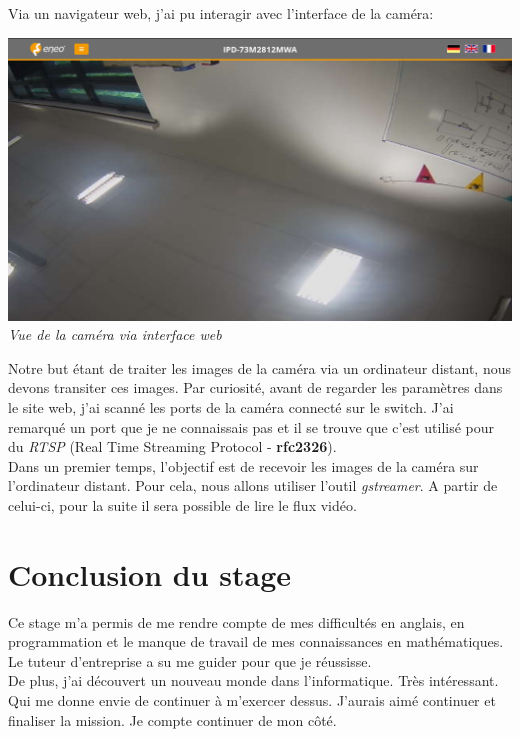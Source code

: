 \documentclass[12pt, french]{report}
\begin{document}
Via un navigateur web, j'ai pu interagir avec l'interface de la caméra:
\begin{center}
\includegraphics[width=\textwidth]{Cameras/WebSiteView.png}\\
\textit{Vue de la caméra via interface web}\\
\end{center}

Notre but étant de traiter les images de la caméra via un ordinateur distant, nous devons transiter ces images. Par curiosité, avant de regarder les paramètres dans le site web, j'ai scanné les ports de la caméra connecté sur le switch. J'ai remarqué un port que je ne connaissais pas et il se trouve que c'est utilisé pour du \textit{RTSP} (Real Time Streaming Protocol - \textbf{rfc2326}). \\

Dans un premier temps, l'objectif est de recevoir les images de la caméra sur l'ordinateur distant. Pour cela, nous allons utiliser l'outil \textit{gstreamer}. A partir de celui-ci, pour la suite il sera possible de lire le flux vidéo.

\newpage
\section{Conclusion du stage}

Ce stage m'a permis de me rendre compte de mes difficultés en anglais, en programmation et le manque de travail de mes connaissances en mathématiques. Le tuteur d'entreprise a su me guider pour que je réussisse.\\

De plus, j'ai découvert un nouveau monde dans l'informatique. Très intéressant. Qui me donne envie de continuer à m'exercer dessus. J'aurais aimé continuer et finaliser la mission. Je compte continuer de mon côté.\\
\end{document}
